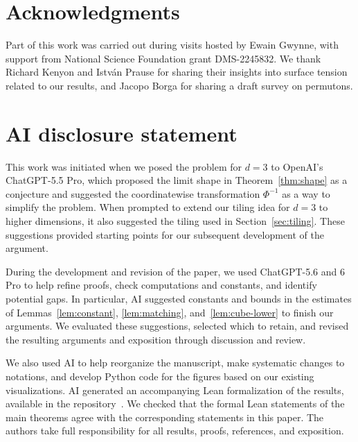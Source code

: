 \documentclass[11pt,letterpaper]{article}
\begin{document}
\section*{Acknowledgments}
Part of this work was carried out during visits hosted by Ewain Gwynne, with support from National Science Foundation grant DMS-2245832. We thank Richard Kenyon and Istv\'an Prause for sharing their insights into surface tension related to our results, and Jacopo Borga for sharing a draft survey on permutons.

\section*{AI disclosure statement}\label{sec:ai}
This work was initiated when we posed the problem for $d=3$ to OpenAI's ChatGPT-5.5 Pro, which proposed the limit shape in Theorem~\ref{thm:shape} as a conjecture and suggested the coordinatewise transformation $\Phi^{-1}$ as a way to simplify the problem. When prompted to extend our tiling idea for $d=3$ to higher dimensions, it also suggested the tiling used in Section~\ref{sec:tiling}. These suggestions provided starting points for our subsequent development of the argument.

During the development and revision of the paper, we used ChatGPT-5.6 and 6 Pro to help refine proofs, check computations and constants, and identify potential gaps. In particular, AI suggested constants and bounds in the estimates of Lemmas~\ref{lem:constant}, \ref{lem:matching}, and~\ref{lem:cube-lower} to finish our arguments. We evaluated these suggestions, selected which to retain, and revised the resulting arguments and exposition through discussion and review.

We also used AI to help reorganize the manuscript, make systematic changes to notations, and develop Python code for the figures based on our existing visualizations. AI generated an accompanying Lean formalization of the results, available in the repository~\cite{antichain-lean}. We checked that the formal Lean statements of the main theorems agree with the corresponding statements in this paper. The authors take full responsibility for all results, proofs, references, and exposition.


\printbibliography
\end{document}
